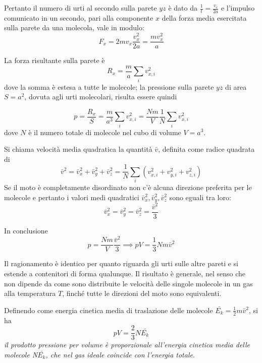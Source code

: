 \documentclass[class=book, crop=false, oneside, 12pt]{standalone}
\begin{document}
Pertanto il numero di urti al secondo sulla parete \(y z\) è dato da \(\frac{1}{t} = \frac{v_c}{2a}\) e l'impulso comunicato in un secondo, pari alla componente \(x\) della forza media esercitata sulla parete da una molecola, vale in modulo:
\begin{equation*}
    F_x = 2m v_x \frac{v^2_x}{2a} = \frac{m v^2_x}{a}
\end{equation*}

La forza risultante sulla parete è
\begin{equation*}
    R_x = \frac{m}{a} \sum_i v_{x,i}^2
\end{equation*}
dove la somma è estesa a tutte le molecole; la pressione sulla parete \(y z\) di area \(S = a^2\), dovuta agli urti molecolari, risulta essere quindi

\begin{equation*}
    p = \frac{R_x}{S} = \frac{m}{a^3} \sum_i v_{x,i}^2 = \frac{N m}{V} \frac{1}{N} \sum_i v_{x,i}^2
\end{equation*}
dove \(N\) è il numero totale di molecole nel cubo di volume \(V= a^3\). 

Si chiama velocità media quadratica la quantità \(\bar{v}\), definita come radice quadrata di 
\begin{equation*}
    \bar{v}^2 =  \bar{v}^2_x + \bar{v}^2_y + \bar{v}^2_z = \frac{1}{N} \sum_i \left(v_{x,i}^2 + v_{y,i}^2 + v_{z,i}^2\right)
\end{equation*}
Se il moto è completamente disordinato non c'è alcuna direzione preferita per le molecole e pertanto i valori medi quadratici \(\bar{v}_x^2, \bar{v}_y^2, \bar{v}_z^2\) sono eguali tra loro:
\begin{equation*}
    \bar{v}_x^2 = \bar{v}_y^2 = \bar{v}_z^2 = \frac{\bar{v}^2}{3}
\end{equation*}

In conclusione
\begin{equation*}
    p = \frac{N m}{V} \frac{\bar{v}^2}{3} \implies pV = \frac{1}{3} N m \bar{v}^2
\end{equation*}

Il ragionamento è identico per quanto riguarda gli urti sulle altre pareti e si estende a contenitori di forma qualunque. 
Il risultato è generale, nel senso che non dipende da come sono distribuite le velocità delle singole molecole in un gas alla temperatura \(T\), finché tutte le direzioni del moto sono equivalenti. 

Definendo come energia cinetica media di traslazione delle molecole \(\bar{E_k} = \frac{1}{2} m \bar{v}^2\), si ha 
\begin{equation*}
    p V = \frac{2}{3} N \bar{E_k}
\end{equation*}
\emph{il prodotto pressione per volume è proporzionale all'energia cinetica media delle molecole N\(\bar{E_k}\), che nel gas ideale coincide con l'energia totale}.
\end{document}
